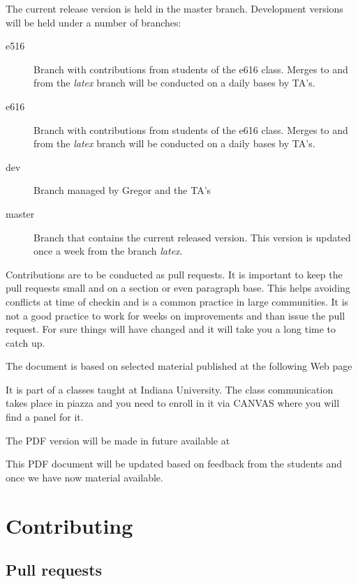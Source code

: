 
The current release version is held in the master branch.
Development versions will be held under a number of branches:

\begin{description}
\item[e516] Branch with contributions from students of the e616
  class. Merges to and from the {\em latex} branch will be conducted
  on a daily bases by TA's.
\item[e616] Branch with contributions from students of the e616
  class. Merges to and from the {\em latex} branch will be conducted
  on a daily bases by TA's.
\item[dev] Branch managed by Gregor and the TA's
\item[master] Branch that contains the current released version. This
  version is updated once a week from the branch {\em latex}.
\end{description}

Contributions are to be conducted as pull requests. It is important to
keep the pull requests small and on a section or even paragraph
base. This helps avoiding conflicts at time of checkin and is a common
practice in large communities. It is not a good practice to work for
weeks on improvements and than issue the pull request. For sure things
will have changed and it will take you a long time to catch up.

The document is based on selected material published at the following
Web page


It is part of a classes taught at Indiana University. The class
communication takes place in piazza and you need to enroll in it via
CANVAS where you will find a panel for it.

The PDF version will be made in future available at 


This PDF document will be updated based on feedback from the students
and once we have now material available. 

\section{Contributing}

\subsection{Pull requests}


